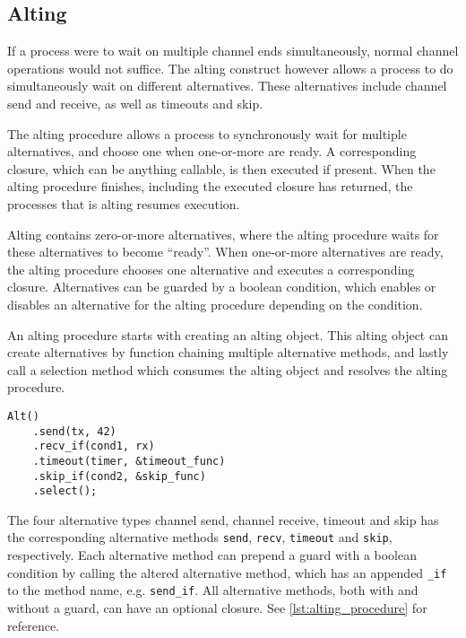 \subsection{Alting}

If a process were to wait on multiple channel ends simultaneously, normal channel operations would not suffice. The alting construct however allows a process to do simultaneously wait on different alternatives. These alternatives include channel send and receive, as well as timeouts and skip.

The alting procedure allows a process to synchronously wait for multiple alternatives, and choose one when one\hyp{}or\hyp{}more are ready. A corresponding closure, which can be anything callable, is then executed if present. When the alting procedure finishes, including the executed closure has returned, the processes that is alting resumes execution.

Alting contains zero\hyp{}or\hyp{}more alternatives, where the alting procedure waits for these alternatives to become ``ready''. When one\hyp{}or\hyp{}more alternatives are ready, the alting procedure chooses one alternative and executes a corresponding closure. Alternatives can be guarded by a boolean condition, which enables or disables an alternative for the alting procedure depending on the condition.

An alting procedure starts with creating an alting object. This alting object can create alternatives by function chaining multiple alternative methods, and lastly call a selection method which consumes the alting object and resolves the alting procedure.

\begin{lstfloat}
\begin{lstlisting}[caption={Example of the alting construct.}, label={lst:alting_procedure}, style={CustomC++}]
Alt()
    .send(tx, 42)
    .recv_if(cond1, rx)
    .timeout(timer, &timeout_func)
    .skip_if(cond2, &skip_func)
    .select();
\end{lstlisting}
\end{lstfloat}

The four alternative types channel send, channel receive, timeout and skip has the corresponding alternative methods \lstinline[style={CustomC++}]|send|, \lstinline[style={CustomC++}]|recv|, \lstinline[style={CustomC++}]|timeout| and \lstinline[style={CustomC++}]|skip|, respectively. Each alternative method can prepend a guard with a boolean condition by calling the altered alternative method, which has an appended \lstinline[style={CustomC++}]|_if| to the method name, e.g. \lstinline[style={CustomC++}]|send_if|. All alternative methods, both with and without a guard, can have an optional closure. See \cref{lst:alting_procedure} for reference.

